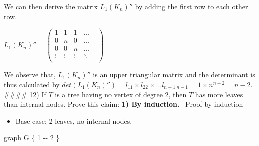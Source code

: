 \documentclass[
]{article}
\newenvironment{Shaded}{}{}
\newcommand{\NormalTok}[1]{#1}
\providecommand{\tightlist}{%
  \setlength{\itemsep}{0pt}\setlength{\parskip}{0pt}}
\begin{document}
We can then derive the matrix \(L_1(K_n)''\) by adding the first row to
each other row.

\(L_1(K_n)'' = \begin{pmatrix}  1 & 1 & 1 & \dots \\  0 & n & 0 &\dots \\  0 & 0 & n &\dots \\  \vdots & \vdots & \vdots & \ddots & \\  \end{pmatrix}\)

We observe that, \(L_1(K_n)''\) is an upper triangular matrix and the
determinant is thus calculated by
\(det(L_1(K_n)'')= l_{11} \times l_{22} \times \dots l_{n-1 \ n-1} = 1 \times n^{n-2} = n-2\).
\#\#\#\# 12) If \(T\) is a tree having no vertex of degree 2, then \(T\)
has more leaves than internal nodes. Prove this claim: \textbf{1) By
induction.} --Proof by induction--

\begin{itemize}
\tightlist
\item
  Base case: 2 leaves, no internal nodes.
\end{itemize}

\begin{Shaded}
\begin{Highlighting}[]
\NormalTok{    graph G \{}
\NormalTok{    1 {-}{-} 2}
\NormalTok{    \}}
\end{Highlighting}
\end{Shaded}
\end{document}
